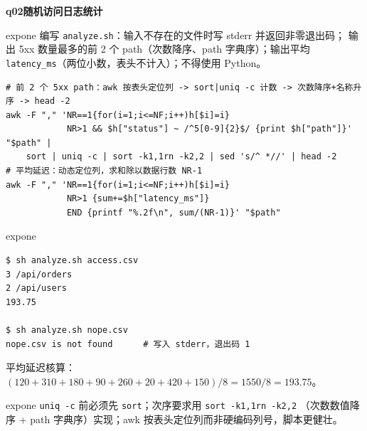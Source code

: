 \documentclass[11pt,a4paper,fontset=none]{ctexart}
\newcommand{\hwbanner}[3]{%
  \par\vspace{1.1em}
  \begin{tcolorbox}[enhanced, colback=#1!8, colframe=#1!75!black,
    boxrule=0.8pt, arc=2pt, left=7pt, right=7pt, top=4pt, bottom=4pt,
    before skip=1.1em]
    {\bfseries\color{#1!75!black}#2\qquad #3}
  \end{tcolorbox}
  \par\vspace{0.1em}\noindent\ignorespaces
}
\newcommand{\sublabel}[2]{%
  \par\vspace{0.8em}\noindent{\bfseries\color{#1!75!black}#2}\par\nobreak\vspace{0.25em}\noindent\ignorespaces
}
\begin{document}
\hwbanner{expone}{q02}{随机访问日志统计}
\begin{reqbox}{expone}
  编写 \texttt{analyze.sh}：输入不存在的文件时写 stderr 并返回非零退出码；
  输出 5xx 数量最多的前 2 个 path（次数降序、path 字典序）；输出平均
  \texttt{latency\_ms}（两位小数，表头不计入）；不得使用 Python。
\end{reqbox}
\sublabel{expone}{\faCode\ 关键管道}
\begin{lstlisting}[style=shell]
# 前 2 个 5xx path：awk 按表头定位列 -> sort|uniq -c 计数 -> 次数降序+名称升序 -> head -2
awk -F "," 'NR==1{for(i=1;i<=NF;i++)h[$i]=i}
            NR>1 && $h["status"] ~ /^5[0-9]{2}$/ {print $h["path"]}' "$path" |
    sort | uniq -c | sort -k1,1rn -k2,2 | sed 's/^ *//' | head -2
# 平均延迟：动态定位列，求和除以数据行数 NR-1
awk -F "," 'NR==1{for(i=1;i<=NF;i++)h[$i]=i}
            NR>1 {sum+=$h["latency_ms"]}
            END {printf "%.2f\n", sum/(NR-1)}' "$path"
\end{lstlisting}
\begin{resbox}{expone}
\begin{lstlisting}[style=output]
$ sh analyze.sh access.csv
3 /api/orders
2 /api/users
193.75

$ sh analyze.sh nope.csv
nope.csv is not found      # 写入 stderr，退出码 1
\end{lstlisting}
平均延迟核算：$(120+310+180+90+260+20+420+150)/8 = 1550/8 = 193.75$。
\end{resbox}
\begin{trapbox}{expone}
  \texttt{uniq -c} 前必须先 \texttt{sort}；次序要求用 \texttt{sort -k1,1rn -k2,2}
  （次数数值降序 + path 字典序）实现；awk 按表头定位列而非硬编码列号，脚本更健壮。
\end{trapbox}
\end{document}
